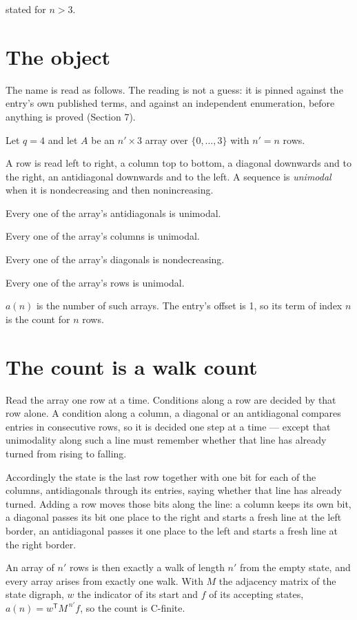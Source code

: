 \documentclass[11pt]{article}
\theoremstyle{definition}
\begin{document}
stated for $n > 3$.

\section{The object}

The name is read as follows. The reading is not a guess: it is pinned against the entry's own published terms, and against an independent enumeration, before anything is proved (Section 7).

Let $q = 4$ and let $A$ be an $n' \times 3$ array over $\{0,\dots,3\}$ with $n' = n$ rows.

A row is read left to right, a column top to bottom, a diagonal downwards and to the right, an antidiagonal downwards and to the left. A sequence is {\itshape unimodal} when it is nondecreasing and then nonincreasing.

Every one of the array's antidiagonals is unimodal.

Every one of the array's columns is unimodal.

Every one of the array's diagonals is nondecreasing.

Every one of the array's rows is unimodal.

$a(n)$ is the number of such arrays. The entry's offset is 1, so its term of index $n$ is the count for $n$ rows.

\section{The count is a walk count}

Read the array one row at a time. Conditions along a row are decided by that row alone. A condition along a column, a diagonal or an antidiagonal compares entries in consecutive rows, so it is decided one step at a time --- except that unimodality along such a line must remember whether that line has already turned from rising to falling.

Accordingly the state is the last row together with one bit for each of the columns, antidiagonals through its entries, saying whether that line has already turned. Adding a row moves those bits along the line: a column keeps its own bit, a diagonal passes its bit one place to the right and starts a fresh line at the left border, an antidiagonal passes it one place to the left and starts a fresh line at the right border.

An array of $n'$ rows is then exactly a walk of length $n'$ from the empty state, and every array arises from exactly one walk. With $M$ the adjacency matrix of the state digraph, $w$ the indicator of its start and $f$ of its accepting states, $a(n) = w^{\mathsf T}M^{\,n'}f$, so the count is C-finite.
\end{document}
